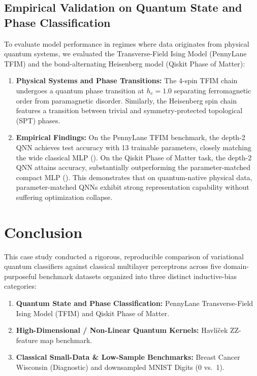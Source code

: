 \subsection{Empirical Validation on Quantum State and Phase Classification}
To evaluate model performance in regimes where data originates from physical quantum systems, we evaluated the Transverse-Field Ising Model (PennyLane TFIM) and the bond-alternating Heisenberg model (Qiskit Phase of Matter):
\begin{enumerate}
  \item \textbf{Physical Systems and Phase Transitions:} The 4-spin TFIM chain undergoes a quantum phase transition at $h_c = 1.0$ separating ferromagnetic order from paramagnetic disorder. Similarly, the Heisenberg spin chain features a transition between trivial and symmetry-protected topological (SPT) phases.
  \item \textbf{Empirical Findings:} On the PennyLane TFIM benchmark, the depth-2 QNN achieves \pennylaneTfimQNNdTwoEntAccuracy{} test accuracy with 13 trainable parameters, closely matching the wide classical MLP (\pennylaneTfimMLPAccuracy{}). On the Qiskit Phase of Matter task, the depth-2 QNN attains \qiskitPhaseOfMatterQNNdTwoEntAccuracy{} accuracy, substantially outperforming the parameter-matched compact MLP (\qiskitPhaseOfMatterMLPSmallAccuracy{}). This demonstrates that on quantum-native physical data, parameter-matched QNNs exhibit strong representation capability without suffering optimization collapse.
\end{enumerate}

\section{Conclusion}
This case study conducted a rigorous, reproducible comparison of variational quantum classifiers against classical multilayer perceptrons across five domain-purposeful benchmark datasets organized into three distinct inductive-bias categories:
\begin{enumerate}
  \item \textbf{Quantum State and Phase Classification:} PennyLane Transverse-Field Ising Model (TFIM) and Qiskit Phase of Matter.
  \item \textbf{High-Dimensional / Non-Linear Quantum Kernels:} Havl\'i\v{c}ek ZZ-feature map benchmark.
  \item \textbf{Classical Small-Data \& Low-Sample Benchmarks:} Breast Cancer Wisconsin (Diagnostic) and downsampled MNIST Digits (0 vs.\ 1).
\end{enumerate}

